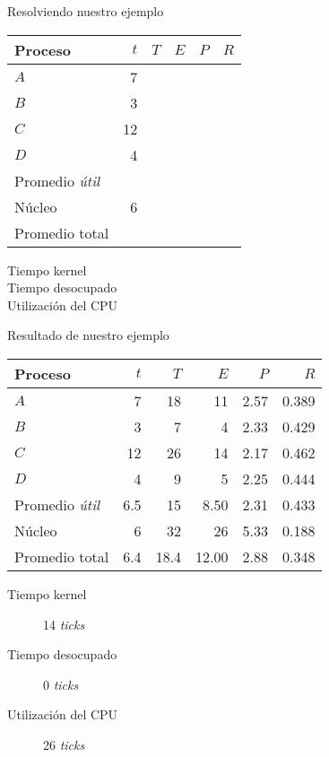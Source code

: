 \documentclass[presentation]{beamer}
\begin{document}
\begin{frame}[label={sec:org971131c}]{Resolviendo nuestro ejemplo}
\begin{center}
\begin{center}
\begin{tabular}{lrllll}
Proceso & \(t\) & \(T\) & \(E\) & \(P\) & \(R\)\\
\hline
\(A\) & 7 &  &  &  & \\
\(B\) & 3 &  &  &  & \\
\(C\) & 12 &  &  &  & \\
\(D\) & 4 &  &  &  & \\
Promedio \emph{útil} &  &  &  &  & \\
\hline
Núcleo & 6 &  &  &  & \\
\hline
Promedio total &  &  &  &  & \\
\end{tabular}
\end{center}


\begin{description}
\item[{Tiempo kernel}] 

\item[{Tiempo desocupado}] 

\item[{Utilización del CPU}] 
\end{description}
\end{center}
\end{frame}
\begin{frame}[label={sec:org06fd653}]{Resultado de nuestro ejemplo}
\begin{center}
\begin{center}
\begin{tabular}{lrrrrr}
Proceso & \(t\) & \(T\) & \(E\) & \(P\) & \(R\)\\
\hline
\(A\) & 7 & 18 & 11 & 2.57 & 0.389\\
\(B\) & 3 & 7 & 4 & 2.33 & 0.429\\
\(C\) & 12 & 26 & 14 & 2.17 & 0.462\\
\(D\) & 4 & 9 & 5 & 2.25 & 0.444\\
Promedio \emph{útil} & 6.5 & 15 & 8.50 & 2.31 & 0.433\\
\hline
Núcleo & 6 & 32 & 26 & 5.33 & 0.188\\
\hline
Promedio total & 6.4 & 18.4 & 12.00 & 2.88 & 0.348\\
\end{tabular}
\end{center}

\begin{description}
\item[{Tiempo kernel}] 14 \emph{ticks}
\item[{Tiempo desocupado}] 0 \emph{ticks}
\item[{Utilización del CPU}] 26 \emph{ticks}
\end{description}
\end{center}
\end{frame}
\end{document}
